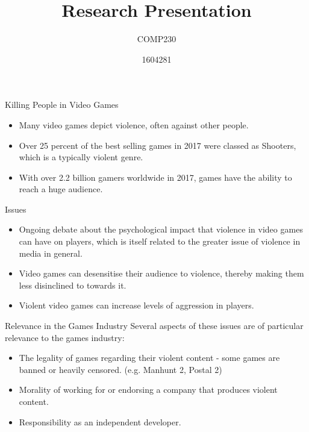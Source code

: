 \documentclass{beamer}
\title{Research Presentation}
\subtitle{COMP230}
\author{1604281}
\begin{document}
\begin{frame}
	\maketitle
\end{frame}

\begin{frame}{Killing People in Video Games}
    \begin{itemize}
        \item Many video games depict violence, often against other people. 
        
        \item Over 25 percent of the best selling games in 2017 were classed as Shooters, which is a typically violent genre. \cite{numberOfGamers}
        
        \item With over 2.2 billion gamers worldwide in 2017, games have the ability to reach a huge audience. \cite{esaReport}
        
    \end{itemize}
\end{frame}

\begin{frame}{Issues}


    \begin{itemize}    
    	\item Ongoing debate about the psychological impact that violence in video games can have on players, which is itself related to the greater issue of violence in media in general. \cite{ExposureLink}
    	    
        \item Video games can desensitise their audience to violence, thereby making them less disinclined to towards it. \cite{devalueViolence}
        
        \item Violent video games can increase levels of aggression in players. \cite{anderson2007violent}        
        
    \end{itemize}

\end{frame}

\begin{frame}{Relevance in the Games Industry}
    Several aspects of these issues are of particular relevance to the games industry: 
    
    \begin{itemize}
        \item The legality of games regarding their violent content - some games are banned or heavily censored. (e.g. Manhunt 2, Postal 2)
        
        \item Morality of working for or endorsing a company that produces violent content.
        
        \item Responsibility as an independent developer.
        
    \end{itemize}
\end{frame}
\end{document}

